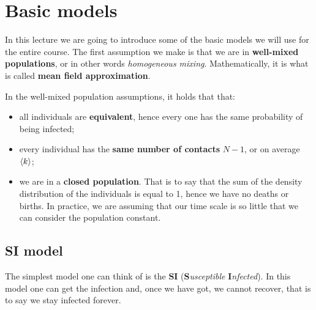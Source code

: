 \documentclass[../main/main.tex]{subfiles}
\begin{document}

\section{Basic models}

In this lecture we are going to introduce some of the basic models we will use for the entire course. The first assumption we make is that we are in \textbf{well-mixed populations}, or in other words \textit{homogeneous mixing}. Mathematically, it is what is called \textbf{mean field approximation}.

In the well-mixed population assumptions, it holds that that:
\begin{itemize}
\item all individuals are \textbf{equivalent}, hence every one has the same probability of being infected;
\item every individual has the \textbf{same number of contacts} $N-1$, or on average $\expval{k}$;
\item we are in a \textbf{closed population}. That is to say that the sum of the density distribution of the individuals is equal to 1, hence we have no deaths or births. In practice, we are assuming that our time scale is so little that we can consider the population constant.
\end{itemize}

\subsection{SI model}

The simplest model one can think of is the \textbf{SI} (\textbf{S}\textit{usceptible} \textbf{I}\textit{nfected}). In this model one can get the infection and, once we have got, we cannot recover, that is to say we stay infected forever.
\end{document}
